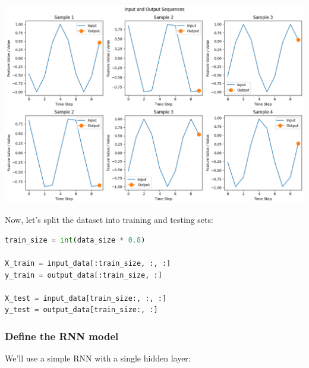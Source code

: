 \includegraphics{img//rnn//intro/output_5_0.png}

Now, let's split the dataset into training and testing sets:

\begin{lstlisting}[language=Python]
train_size = int(data_size * 0.8)

X_train = input_data[:train_size, :, :]
y_train = output_data[:train_size, :]

X_test = input_data[train_size:, :, :]
y_test = output_data[train_size:, :]
\end{lstlisting}

\subsubsection{Define the RNN model}\label{define-the-rnn-model}

We'll use a simple RNN with a single hidden layer:

